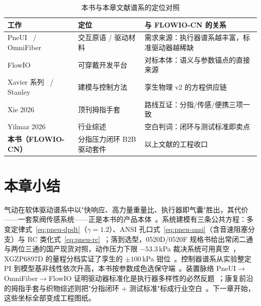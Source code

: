 \begin{table}[htbp]
  \centering
  \caption{本书与本章文献谱系的定位对照}
  \label{tab:pneu-position}
  \begin{tabular}{lp{3.6cm}p{3.2cm}}
    \toprule
    工作 & 定位 & 与 FLOWIO-CN 的关系 \\
    \midrule
    PneUI~\cite{Yao2013} / OmniFiber~\cite{Afsar2021} & 交互原语 / 驱动材料 & 需求来源：执行器谱系越丰富，标准驱动器越稀缺 \\
    FlowIO~\cite{Shtarbanov2021,Shtarbanov2025} & 可穿戴开发平台 & 对标本体：语义与参数锚点的直接来源 \\
    Xavier 系列~\cite{Xavier2020AIM,Xavier2022Frontiers} / Stanley~\cite{Stanley2021} & 建模与控制方法 & 孪生物理 v2 的方程供应链 \\
    Xie 2026~\cite{Xie2026} & 顶刊拇指手套 & 路线互证：分指/传感/便携三项一致 \\
    Yilmaz 2026~\cite{Yilmaz2026} & 行业综述 & 空白判词：闭环与测试标准即卖点 \\
    \textbf{本书（FLOWIO-CN）} & 分指压力闭环 B2B 驱动套件 & 以上文献的工程收口 \\
    \bottomrule
  \end{tabular}
\end{table}

\section*{本章小结}
气动在软体驱动谱系中以"快响应、高力量重量比、执行器即气囊"胜出，其代价——一套泵阀传感系统——正是本书的产品本体~\cite{Xavier2022Frontiers,Sansone2022}。系统建模有三条公共方程：多变定律式~\eqref{eq:pneu-dpdt}（$\gamma{=}1.2$）、ANSI 孔口式~\eqref{eq:pneu-ansi}（含音速阻塞分支）与 RC 类化式~\eqref{eq:pneu-rc}~\cite{Xavier2020AIM,Xavier2022Frontiers,Stanley2021}；落到选型，0520D/0520F 规格书给出常闭二通与两位三通的国产现货对照，动作压力下限 $-53.3$\,kPa 裁决系统可用真空~\cite{valve-0520d-ds,valve-0520f-ds}，XGZP6897D 的量程分档实证了孪生的 $\pm100$\,kPa 钳位~\cite{xgzp6897d-v11}。控制器谱系从实验整定 PI 到模型基非线性依次升高，本书按参数成色选保守端~\cite{Xavier2022Frontiers}。装置脉络 PneUI$\to$OmniFiber$\to$FlowIO 证明驱动器标准化是执行器多样性的必然反题~\cite{Yao2013,Afsar2021,Shtarbanov2021}；康复前沿的拇指手套与织物综述则把"分指闭环 + 测试标准"标成行业空白~\cite{Xie2026,Yilmaz2026}。下一章开始，这些坐标全部变成工程图纸。
